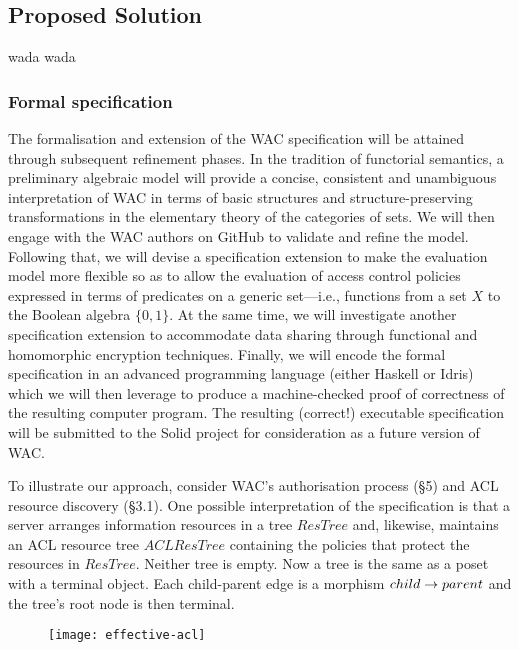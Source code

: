 \subsection{Proposed Solution}

wada wada

\subsubsection{Formal specification}
The formalisation and extension of the WAC specification will be
attained through subsequent refinement phases. In the tradition of
functorial semantics\cite{lawvere1963functorial, bonchi2017functorial},
a preliminary algebraic model will provide a concise, consistent and
unambiguous interpretation of WAC in terms of basic structures and
structure-preserving transformations in the elementary theory of the
categories of sets\cite{lawvere1964elementary, leinster2014rethinking}.
We will then engage with the WAC authors on GitHub to validate and
refine the model. Following that, we will devise a specification extension
to make the evaluation model more flexible so as to allow the evaluation
of access control policies expressed in terms of predicates on a generic
set---i.e., functions from a set $X$ to the Boolean algebra $\{0,1\}$.
At the same time, we will investigate another specification extension
to accommodate data sharing through functional\cite{boneh2011functional}
and homomorphic\cite{gentry2009fully} encryption techniques. Finally,
we will encode the formal specification in an advanced programming
language (either Haskell\cite{peytonjones:h98} or Idris\cite{brady2013idris})
which we will then leverage to produce a machine-checked proof of
correctness of the resulting computer program. The resulting (correct!)
executable specification will be submitted to the Solid project for
consideration as a future version of WAC.

To illustrate our approach, consider WAC's authorisation process (\S 5)
and ACL resource discovery (\S 3.1). One possible interpretation of
the specification is that a server arranges information resources
in a tree $ResTree$ and, likewise, maintains an ACL resource tree
$ACLResTree$ containing the policies that protect the resources in
$ResTree$. Neither tree is empty. Now a tree is the same as a poset
with a terminal object. Each child-parent edge is a morphism
$child \rightarrow parent$ and the tree's root node is then terminal.

\begin{wrapfigure}{r}{0.5\textwidth}
  \texttt{[image: effective-acl]}
\end{wrapfigure}

